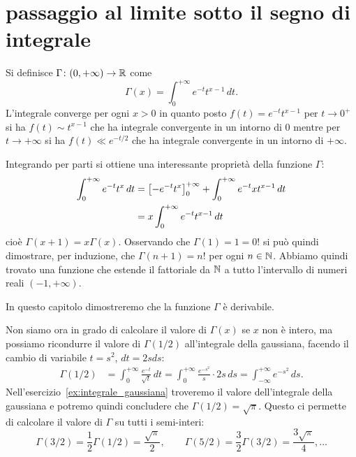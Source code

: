 \section{passaggio al limite sotto il segno di integrale}
\label{sec:scambio_integrale_limite}%

\begin{example}%
  \label{ex:gamma_eulero}%
  Si definisce $\Gamma\colon (0,+\infty) \to {\mathbb R}$ come
  \[
    \Gamma(x) = \int_0^{+\infty} e^{-t} t^{x-1}\, dt.
  \]
  L'integrale converge per ogni $x>0$ in quanto posto
  $f(t) = e^{-t} t^{x-1}$ per $t\to 0^+$ si ha $f(t) \sim t^{x-1}$ che ha
  integrale convergente in un intorno di $0$ mentre per $t\to +\infty$ si ha
  $f(t) \ll e^{-t/2}$ che ha integrale convergente in un intorno di $+\infty$.
  
  Integrando per parti si ottiene una interessante proprietà della funzione $\Gamma$:
  \begin{align*}
  \int_0^{+\infty} e^{-t}t^{x}\, dt
  &= {\left[ -e^{-t}t^{x} \right]}_0^{+\infty}
  + \int_0^{+\infty} e^{-t}xt^{x-1}\, dt\\
  &= x\int_0^{+\infty} e^{-t}t^{x-1}\, dt
  \end{align*}
  cioè $\Gamma(x+1) = x\Gamma(x)$.
  Osservando che $\Gamma(1)=1=0!$ si può quindi dimostrare, per induzione,
  che $\Gamma(n+1) = n!$ per ogni $n\in {\mathbb N}$.
  Abbiamo quindi trovato una funzione che estende il fattoriale
  da ${\mathbb N}$ a tutto l'intervallo di numeri reali $(-1,+\infty)$.
  
  In questo capitolo dimostreremo 
  che la funzione $\Gamma$ è derivabile.
  
  Non siamo ora in grado di calcolare il valore di $\Gamma(x)$ se $x$ 
  non è intero, ma possiamo ricondurre il valore di $\Gamma(1/2)$ 
  all'integrale della gaussiana, facendo il cambio 
  di variabile $t=s^2$, $dt=2s ds$:
  \begin{align*}
  \Gamma(1/2) 
  &= \int_0^{+\infty} \frac{e^{-t}}{\sqrt t}\, dt  
  = \int_0^{+\infty} \frac{e^{-s^2}}{s} \cdot 2s\, ds
  = \int_{-\infty}^{+\infty} e^{-s^2}\, ds.
  \end{align*}
  Nell'esercizio~\ref{ex:integrale_gaussiana} troveremo il valore 
  dell'integrale della gaussiana e potremo 
  quindi concludere che $\Gamma(1/2) = \sqrt \pi$.
  Questo ci permette di calcolare il valore di $\Gamma$ su 
  tutti i semi-interi:
  \[
  \Gamma(3/2) = \frac 1 2 \Gamma(1/2) = \frac{\sqrt \pi}{2}, \qquad
  \Gamma(5/2) = \frac 3 2 \Gamma(3/2) = \frac{3\sqrt \pi}{4}, \dots 
  \]
\end{example}
    
